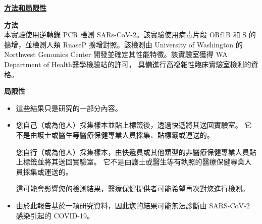 \documentclass[10pt]{article}
\begin{document}
\bigskip

\large \underline{\textbf{方法和局限性}}

\textbf{方法}\\
本實驗使用逆轉錄 PCR 檢測 SARs-CoV-2。該實驗使用病毒片段 ORf1B 和 S 的擴增，並檢測人類
RnaseP 擴增對照。該檢測由 University of Washington 的 Northwest Genomics Center
開發並確定其性能特徵。該實驗室獲得 WA Department of Health醫學檢驗站的許可，
具備進行高複雜性臨床實驗室檢測的資格。

\textbf{局限性}

\begin{itemize}

\item

  這些結果只是研究的一部分內容。

\item
  您自己（或為他人）採集樣本並貼上標籤後，透過快遞將其送回實驗室。
  它不是由護士或醫生等醫療保健專業人員採集、貼標籤或運送的。

  您自行（或為他人）採集樣本，由快遞員或其他類型的非醫療保健專業人員貼上標籤並將其送回實驗室。
  它不是由護士或醫生等有執照的醫療保健專業人員採集或運送的。


  這可能會影響您的檢測結果，醫療保健提供者可能希望再次對您進行檢測。

\item

  由於此報告基於一項研究資料，因此您的結果可能無法診斷由 SARS-CoV-2 感染引起的 COVID-19。

\end{itemize}
\end{document}
